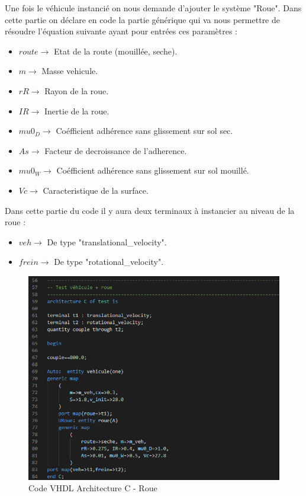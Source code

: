 Une fois le véhicule instancié on nous demande d'ajouter le système "Roue". Dans cette partie on déclare en code la partie générique qui va nous permettre de résoudre l'équation suivante ayant pour entrées ces paramètres :\\
\begin{itemize}
    \item $route       \rightarrow$ Etat de la route (mouillée, seche).
    \item $m       \rightarrow$ Masse vehicule.
    \item $rR        \rightarrow$ Rayon de la roue.
    \item $IR  \rightarrow$ Inertie de la roue.
    \item $mu0_D \rightarrow$ Coéfficient adhérence sans glissement sur sol sec.
    \item $As \rightarrow$ Facteur de decroissance de l'adherence.
    \item $mu0_W \rightarrow$ Coéfficient adhérence sans glissement sur sol mouillé.
    \item $Vc \rightarrow$ Caracteristique de la surface.
\end{itemize}


Dans cette partie du code il y aura deux terminaux à instancier au niveau de la roue :\\

\begin{itemize}
    \item $veh  \rightarrow $ De type "translational\_velocity".
    \item $frein    \rightarrow $ De type "rotational\_velocity".
\end{itemize}

\begin{figure}[h]
    \centering
    \includegraphics[width=\textwidth]{images/Roue.png}
    \caption{Code VHDL Architecture C - Roue}
\end{figure}

